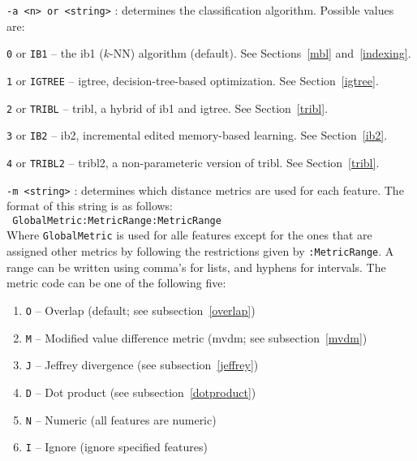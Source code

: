\documentclass{report}
\begin{document}
\begin{description}

\item {\tt -a <n> or <string>} : determines the classification
algorithm. Possible values are:

	\begin{description}
	\item {\tt 0} or {\tt IB1} -- the {\sc ib1} ($k$-NN) algorithm (default). See Sections~\ref{mbl} and~\ref{indexing}.
	\item {\tt 1} or {\tt IGTREE} -- {\sc igtree}, decision-tree-based optimization. See Section~\ref{igtree}.
	\item {\tt 2} or {\tt TRIBL} -- {\sc tribl}, a hybrid of {\sc ib1} and {\sc igtree}. See Section~\ref{tribl}.
	\item {\tt 3} or {\tt IB2} -- {\sc ib2}, incremental edited memory-based learning. See Section~\ref{ib2}.
	\item {\tt 4} or {\tt TRIBL2} -- {\sc tribl2}, a non-parameteric version of {\sc tribl}. See Section~\ref{tribl}.
	\end{description}

\item {\tt -m <string>} : determines which distance metrics are used
for each feature. The format of this string is as follows:\\ {\tt
GlobalMetric:MetricRange:MetricRange}\\ Where {\tt GlobalMetric} is
used for alle features except for the ones that are assigned other
metrics by following the restrictions given by {\tt :MetricRange}.  A
range can be written using comma's for lists, and hyphens for
intervals. The metric code can be one of the following five:

\begin{enumerate}
\item {\tt O} -- Overlap (default; see subsection~\ref{overlap})
\item {\tt M} -- Modified value difference metric ({\sc mvdm}; see subsection~\ref{mvdm})
\item {\tt J} -- Jeffrey divergence (see subsection~\ref{jeffrey})
\item {\tt D} -- Dot product (see subsection~\ref{dotproduct})
\item {\tt N} -- Numeric (all features are numeric)
\item {\tt I} -- Ignore (ignore specified features)
\end{enumerate}


\end{description}
\end{document}
